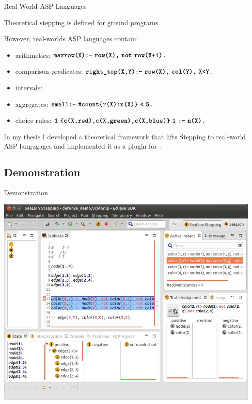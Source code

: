 \documentclass{beamer}
\begin{document}
\begin{frame}{Real-World ASP Languages}
	\onslide<+->
	
	Theoretical stepping is defined for ground programs.
	
	\onslide<+->
	
	However, real-worlds ASP languages contain:
	
	\begin{itemize}
		\item arithmetics: $\code{maxrow(X):-}\ \code{row(X),}\ \code{not}\ \code{row(X+1).}$
		\onslide<+->
		\item comparison predicates: $\code{right\_top(X,Y):-}\ \code{row(X),}\ \code{col(Y),}\ \code{X<Y.}$
		\onslide<+->
		\item intervals: 
		\onslide<+->
		\item aggregates: $\code{small:-}\ \code{\#count\{r(X):n(X)\}}\ \code{<}\ \code{5.}$
		\onslide<+->
		\item choice rules: $\code{1}\ \code{\{c(X,red),c(X,green),c(X,blue)\}}\ \code{1}\ \code{:-}\ \code{n(X).}$
	\end{itemize}
	
	\onslide<+->
	
	In my thesis I developed a theoretical framework that lifts Stepping to real-world ASP langugages
	and implemented it as a plugin for \sealion.
	
\end{frame}


\subsection{Demonstration}

\begin{frame}{Demonstration}
	
	\includegraphics[width=\textwidth]{stepping_perspective}
	
\end{frame}
\end{document}
